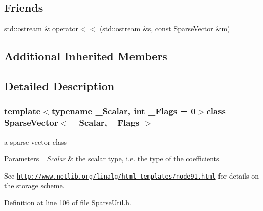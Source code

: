\subsection*{Friends}
\begin{DoxyCompactItemize}
\item 
std\-::ostream \& \hyperlink{class_sparse_vector_a6cf8a05d15fd30ee4fb01ecb778305c3}{operator$<$$<$} (std\-::ostream \&\hyperlink{glext_8h_ad585a1393cfa368fa9dc3d8ebff640d5}{s}, const \hyperlink{class_sparse_vector}{Sparse\-Vector} \&\hyperlink{glext_8h_af593500c283bf1a787a6f947f503a5c2}{m})
\end{DoxyCompactItemize}
\subsection*{Additional Inherited Members}


\subsection{Detailed Description}
\subsubsection*{template$<$typename \-\_\-\-Scalar, int \-\_\-\-Flags = 0$>$class Sparse\-Vector$<$ \-\_\-\-Scalar, \-\_\-\-Flags $>$}

a sparse vector class 


\begin{DoxyParams}{Parameters}
{\em \-\_\-\-Scalar} & the scalar type, i.\-e. the type of the coefficients\\
\hline
\end{DoxyParams}
See \href{http://www.netlib.org/linalg/html_templates/node91.html}{\tt http\-://www.\-netlib.\-org/linalg/html\-\_\-templates/node91.\-html} for details on the storage scheme. 

Definition at line 106 of file Sparse\-Util.\-h.



